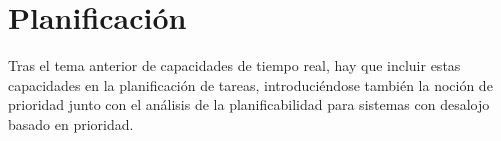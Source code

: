 \section{Planificación}

Tras el tema anterior de capacidades de tiempo real, hay que incluir estas
capacidades en la planificación de tareas, introduciéndose también la noción de
prioridad junto con el análisis de la planificabilidad para sistemas con
desalojo basado en prioridad.
